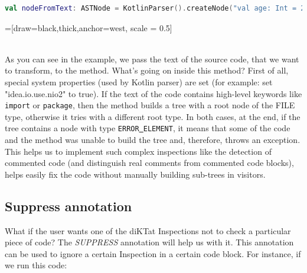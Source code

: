 \begin{lstlisting}[caption={Example of creating an AST from text of code.}, label={lst:example1}, language=Kotlin]
	val nodeFromText: ASTNode = KotlinParser().createNode("val age: Int = 21")
\end{lstlisting}

=[draw=black,thick,anchor=west, scale = 0.5]
  
\\

As you can see in the example, we pass the text of the source code, that we want to transform, to the method.  What's going on inside this method? First of all, special system properties (used by Kotlin parser) are set (for example: set "idea.io.use.nio2" to true). If the text of the code contains high-level keywords like \texttt{import} or \texttt{package}, then the method builds a tree with a root node of the FILE type, otherwise it tries with a different root type. In both cases, at the end, if the tree contains a node with type \texttt{ERROR\underline{ }ELEMENT}, it means that some of the code and the method was unable to build the tree and, therefore, throws an exception.\\
This helps us to implement such complex inspections like the detection of commented code (and distinguish real comments from commented code blocks), helps easily fix the code without manually building sub-trees in visitors.\\

\subsection{Suppress annotation}
\par
What if the user wants one of the diKTat Inspections not to check a particular piece of code? The \textsl{SUPPRESS} annotation will help us with it. This annotation can be used to ignore a certain Inspection in a certain code block. For instance, if we run this code:
\newpage

